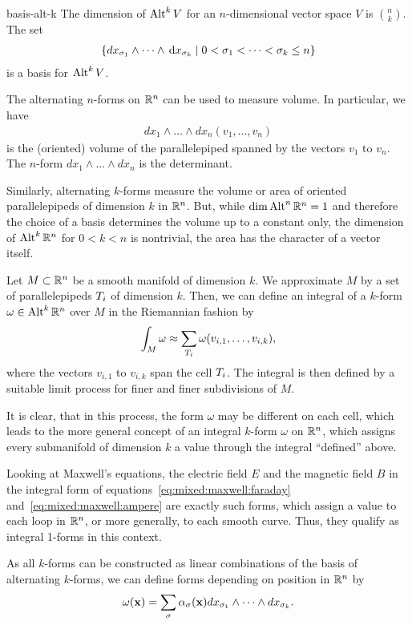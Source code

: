 \begin{Lemma}{basis-alt-k}
  The dimension of $\operatorname{Alt}^k V$ for an $n$-dimensional vector space $V$
  is $\binom nk$. The set
  \begin{gather}
    \left\{ dx_{\sigma_1}\wedge\dots\wedge\,\mathrm{d} x_{\sigma_k} \;\middle|\;
      0<\sigma_1 < \dots < \sigma_k\le n \right\}
  \end{gather}
  is a basis for $\operatorname{Alt}^k V$.
\end{Lemma}

\begin{remark}
  The alternating $n$-forms on $\mathbb R^n$ can be used to measure volume. In particular,
  we have
  \begin{gather}
    dx_1\wedge\dots\wedge dx_n(v_1,\dots,v_n)
  \end{gather}
  is the (oriented) volume of the parallelepiped spanned by the
  vectors $v_1$ to $v_n$. The $n$-form $dx_1\wedge\dots\wedge dx_n$ is
  the determinant.

  Similarly, alternating $k$-forms measure the volume or area of oriented
  parallelepipeds of dimension $k$ in $\mathbb R^n$. But, while
  $\dim\operatorname{Alt}^n\mathbb R^n = 1$ and therefore the choice of a basis determines
  the volume up to a constant only, the dimension of $\operatorname{Alt}^k\mathbb R^n$ for
  $0<k<n$ is nontrivial, the area has the character of a vector itself.
\end{remark}

\begin{intro}
  Let $M \subset \mathbb R^n$ be a smooth manifold of dimension $k$. We
  approximate $M$ by a set of parallelepipeds $T_i$ of dimension
  $k$. Then, we can define an integral of a $k$-form
  $\omega\in \operatorname{Alt}^k\mathbb R^n$ over $M$ in the Riemannian fashion by
  \begin{gather}
    \int_M \omega \approx \sum_{T_i} \omega(v_{i,1},\dots, v_{i,k}),
  \end{gather}
  where the vectors $v_{i,1}$ to $v_{i,k}$ span the cell
  $T_i$. The integral is then defined by a suitable limit process
  for finer and finer subdivisions of $M$.

  It is clear, that in this process, the form $\omega$ may be
  different on each cell, which leads to the more general concept of
  an integral $k$-form $\omega$ on $\mathbb R^n$, which assigns every
  submanifold of dimension $k$ a value through the integral
  ``defined'' above.

  Looking at Maxwell's equations, the electric field $E$ and the
  magnetic field $B$ in the integral form of
  equations~\eqref{eq:mixed:maxwell:faraday}
  and~\eqref{eq:mixed:maxwell:ampere} are exactly such forms, which
  assign a value to each loop in $\mathbb R^n$, or more generally, to each
  smooth curve. Thus, they qualify as integral 1-forms in this
  context.

  As all $k$-forms can be constructed as linear combinations of the
  basis of alternating $k$-forms, we can define forms depending on
  position in $\mathbb R^n$ by
  \begin{gather}
    \omega(\mathbf x) = \sum_{\sigma} \alpha_{\sigma}(\mathbf x)
    dx_{\sigma_1}\wedge\dots\wedge dx_{\sigma_k}.
  \end{gather}
\end{intro}

